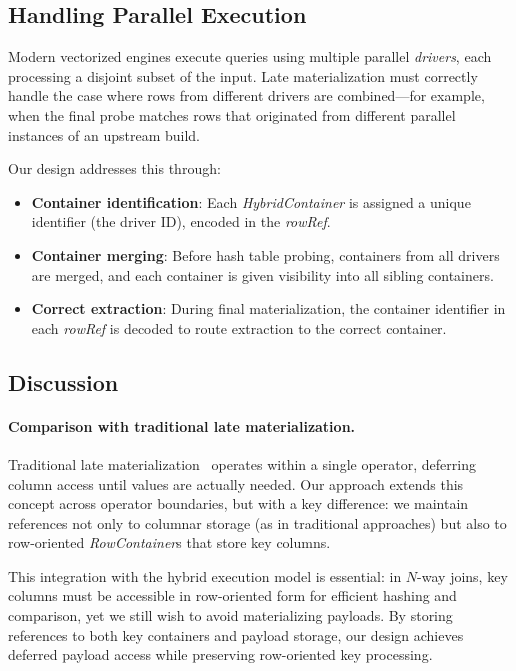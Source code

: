 \subsection{Handling Parallel Execution}

Modern vectorized engines execute queries using multiple parallel \emph{drivers}, each processing a disjoint subset of the input.
Late materialization must correctly handle the case where rows from different drivers are combined—for example, when the final probe matches rows that originated from different parallel instances of an upstream build.

Our design addresses this through:
\begin{itemize}[leftmargin=*]
  \item \textbf{Container identification}: Each \emph{HybridContainer} is assigned a unique identifier (the driver ID), encoded in the \emph{rowRef}.
  \item \textbf{Container merging}: Before hash table probing, containers from all drivers are merged, and each container is given visibility into all sibling containers.
  \item \textbf{Correct extraction}: During final materialization, the container identifier in each \emph{rowRef} is decoded to route extraction to the correct container.
\end{itemize}

\subsection{Discussion}

\paragraph{Comparison with traditional late materialization.}
Traditional late materialization~\cite{abadi-column-stores, monetdb-late-m} operates within a single operator, deferring column access until values are actually needed.
Our approach extends this concept across operator boundaries, but with a key difference: we maintain references not only to columnar storage (as in traditional approaches) but also to row-oriented \emph{RowContainer}s that store key columns.

This integration with the hybrid execution model is essential: in $N$-way joins, key columns must be accessible in row-oriented form for efficient hashing and comparison, yet we still wish to avoid materializing payloads.
By storing references to both key containers and payload storage, our design achieves deferred payload access while preserving row-oriented key processing.

